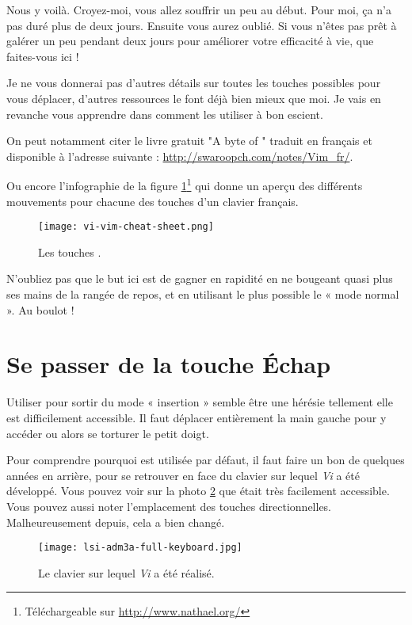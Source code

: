 Nous y voilà. Croyez-moi, vous allez souffrir un peu au début. Pour moi, ça n'a pas duré plus de deux jours. Ensuite vous aurez oublié. Si vous n'êtes pas prêt à galérer un peu pendant deux jours pour améliorer votre efficacité à vie, que faites-vous ici !

Je ne vous donnerai pas d'autres détails sur toutes les touches possibles pour vous déplacer, d'autres ressources le font déjà bien mieux que moi. Je vais en revanche vous apprendre dans  comment les utiliser à bon escient.

On peut notamment citer le livre gratuit "A byte of \vim" traduit en français et disponible à l'adresse suivante : \url{http://swaroopch.com/notes/Vim_fr/}.

Ou encore l'infographie de la figure \ref{fig:vim-cheat-sheet}\footnote{Téléchargeable sur \url{http://www.nathael.org/}} qui donne un aperçu des différents mouvements pour chacune des touches d'un clavier français.

\begin{figure}%
  \texttt{[image: vi-vim-cheat-sheet.png]}
  \caption{Les touches \vim.}
  \label{fig:vim-cheat-sheet}
\end{figure}

N'oubliez pas que le but ici est de gagner en rapidité en ne bougeant quasi plus ses mains de la rangée de repos, et en utilisant le plus possible le « mode normal ». Au boulot !

\section{Se passer de la touche Échap}\label{sec:esc}

Utiliser \ttesc pour sortir du mode « insertion » semble être une hérésie tellement elle est difficilement accessible. Il faut déplacer entièrement la main gauche pour y accéder ou alors se torturer le petit doigt.

Pour comprendre pourquoi \ttesc est utilisée par défaut, il faut faire un bon de quelques années en arrière, pour se retrouver en face du clavier sur lequel \emph{Vi} a été développé. Vous pouvez voir sur la photo \ref{fig:vim-keyboard} que \ttesc était très facilement accessible. Vous pouvez aussi noter l'emplacement des touches directionnelles. Malheureusement depuis, cela a bien changé.

\begin{figure}%
  \texttt{[image: lsi-adm3a-full-keyboard.jpg]}
  \caption{Le clavier sur lequel \emph{Vi} a été réalisé.}
  \label{fig:vim-keyboard}
\end{figure}

